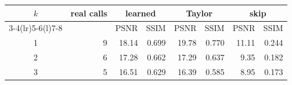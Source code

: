 \begin{tabular}{@{}crrrrrrr@{}}
\toprule
$k$ & real calls & \multicolumn{2}{c}{learned} & \multicolumn{2}{c}{Taylor} & \multicolumn{2}{c}{skip} \\
\cmidrule(lr){3-4}\cmidrule(lr){5-6}\cmidrule(l){7-8}
 & & PSNR & SSIM & PSNR & SSIM & PSNR & SSIM \\
\midrule
1 & 9 & 18.14 & 0.699 & 19.78 & 0.770 & 11.11 & 0.244 \\
2 & 6 & 17.28 & 0.662 & 17.29 & 0.637 & 9.35 & 0.182 \\
3 & 5 & 16.51 & 0.629 & 16.39 & 0.585 & 8.95 & 0.173 \\
\bottomrule
\end{tabular}

